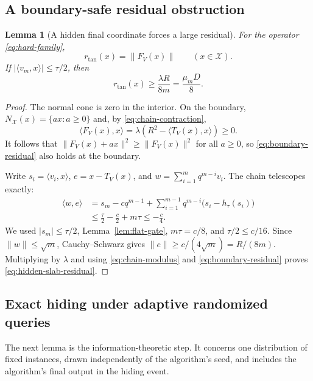 \documentclass[11pt]{article}
\numberwithin{equation}{section}
\newtheorem{lemma}[theorem]{Lemma}
\theoremstyle{definition}
\theoremstyle{remark}
\begin{document}
\subsection{A boundary-safe residual obstruction}

\begin{lemma}[A hidden final coordinate forces a large residual]
\label{lem:hidden-residual}
For the operator \eqref{eq:hard-family},
\begin{equation}\label{eq:boundary-residual}
r_{\mathrm{tan}}(x)=\|F_V(x)\|
\qquad(x\in\mathcal X).
\end{equation}
If $|\langle v_m,x\rangle|\le\tau/2$, then
\begin{equation}\label{eq:hidden-slab-residual}
r_{\mathrm{tan}}(x)
\ge\frac{\lambda R}{8m}
=\frac{\mu_mD}{8}.
\end{equation}
\end{lemma}

\begin{proof}
The normal cone is zero in the interior. On the boundary,
$N_{\mathcal X}(x)=\{ax:a\ge0\}$ and, by \eqref{eq:chain-contraction},
\[
\langle F_V(x),x\rangle
=\lambda(R^2-\langle T_V(x),x\rangle)\ge0.
\]
It follows that $\|F_V(x)+ax\|^2\ge\|F_V(x)\|^2$ for all $a\ge0$,
so \eqref{eq:boundary-residual} also holds at the boundary.

Write $s_i=\langle v_i,x\rangle$, $e=x-T_V(x)$, and
$w=\sum_{i=1}^m q^{m-i}v_i$. The chain telescopes exactly:
\begin{align*}
\langle w,e\rangle
&=s_m-cq^{m-1}
 +\sum_{i=1}^{m-1}q^{m-i}\bigl(s_i-h_\tau(s_i)\bigr)\\
&\le\frac\tau2-\frac c2+m\tau
\le-\frac c4.
\end{align*}
We used $|s_m|\le\tau/2$, Lemma~\ref{lem:flat-gate},
$m\tau=c/8$, and $\tau/2\le c/16$.
Since $\|w\|\le\sqrt m$, Cauchy--Schwarz gives
$\|e\|\ge c/(4\sqrt m)=R/(8m)$. Multiplying by $\lambda$ and using
\eqref{eq:chain-modulus} and \eqref{eq:boundary-residual} proves \eqref{eq:hidden-slab-residual}.
\end{proof}

\subsection{Exact hiding under adaptive randomized queries}

The next lemma is the information-theoretic step. It concerns one
distribution of fixed instances, drawn independently of the algorithm's
seed, and includes the algorithm's final output in the hiding event.
\end{document}

